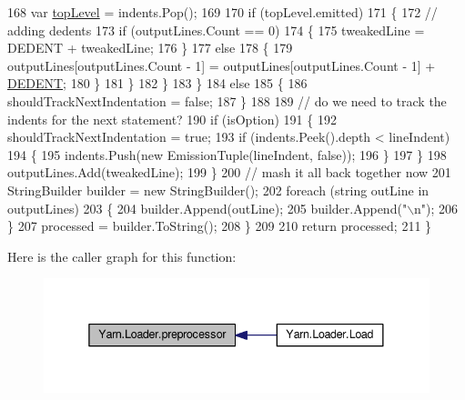 \begin{DoxyCode}
168                             var \hyperlink{a00330_a8b7e5c0b2c6870eaa8f9454b4f33678b}{topLevel} = indents.Pop();
169 
170                             \textcolor{keywordflow}{if} (topLevel.emitted)
171                             \{
172                                 \textcolor{comment}{// adding dedents}
173                                 \textcolor{keywordflow}{if} (outputLines.Count == 0)
174                                 \{
175                                     tweakedLine = DEDENT + tweakedLine;
176                                 \}
177                                 \textcolor{keywordflow}{else}
178                                 \{
179                                     outputLines[outputLines.Count - 1] = outputLines[outputLines.Count - 1]
       + \hyperlink{a00330_a83653c3e52fa74614e655a91ad2b7181}{DEDENT};
180                                 \}
181                             \}
182                         \}
183                     \}
184                     \textcolor{keywordflow}{else}
185                     \{
186                         shouldTrackNextIndentation = \textcolor{keyword}{false};
187                     \}
188 
189                     \textcolor{comment}{// do we need to track the indents for the next statement?}
190                     \textcolor{keywordflow}{if} (isOption)
191                     \{
192                         shouldTrackNextIndentation = \textcolor{keyword}{true};
193                         \textcolor{keywordflow}{if} (indents.Peek().depth < lineIndent)
194                         \{
195                             indents.Push(\textcolor{keyword}{new} EmissionTuple(lineIndent, \textcolor{keyword}{false}));
196                         \}
197                     \}
198                     outputLines.Add(tweakedLine);
199                 \}
200                 \textcolor{comment}{// mash it all back together now}
201                 StringBuilder builder = \textcolor{keyword}{new} StringBuilder();
202                 \textcolor{keywordflow}{foreach} (\textcolor{keywordtype}{string} outLine \textcolor{keywordflow}{in} outputLines)
203                 \{
204                     builder.Append(outLine);
205                     builder.Append(\textcolor{stringliteral}{"\(\backslash\)n"});
206                 \}
207                 processed = builder.ToString();
208             \}
209 
210             \textcolor{keywordflow}{return} processed;
211         \}
\end{DoxyCode}


Here is the caller graph for this function\-:
\nopagebreak
\begin{figure}[H]
\begin{center}
\leavevmode
\includegraphics[width=338pt]{a00123_a0b09a29edd2ed13d52203f1b71a47081_icgraph}
\end{center}
\end{figure}


